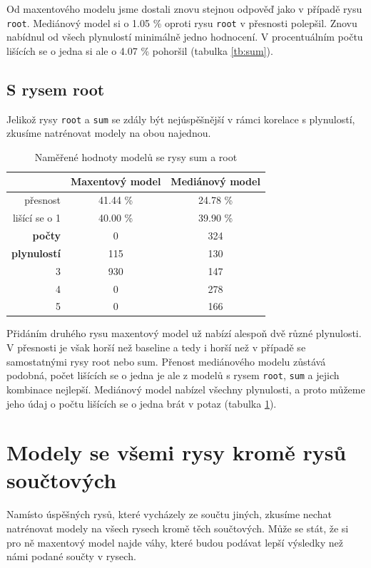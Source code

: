 \documentclass[12pt,a4paper]{report}
\begin{document}
Od maxentového modelu jsme dostali znovu stejnou odpověď jako v případě rysu \texttt{root}. Mediánový model si o 1.05 \% oproti rysu \texttt{root} v přesnosti polepšil. Znovu nabídnul od všech plynulostí minimálně jedno hodnocení. V procentuálním počtu lišících se o jedna si ale o 4.07 \% pohoršil (tabulka \ref{tb:sum}).

\subsection{S rysem root}
Jelikož rysy \texttt{root} a \texttt{sum} se zdály být nejúspěšnější v rámci korelace s plynulostí, zkusíme natrénovat modely na obou najednou.

\begin{table}[!htbp]
\begin{center}
\begin{tabular}{|r|c|c|}
\hline
 & \textbf{Maxentový model} & \textbf{Mediánový model} \\
 \hline
     přesnost & 41.44 \%  & 24.78 \%  \\
\hline
lišící se o 1 & 40.00 \% & 39.90 \%  \\
\hline
     \textbf{počty} \quad 1 & \color{red}0   & \color{OliveGreen}324   \\
\textbf{plynulostí} \quad 2 & 115 & \color{OliveGreen}130   \\
                          3 & 930 & \color{OliveGreen}147 \\
                          4 & \color{red}0   & \color{OliveGreen}278 \\
                          5 & \color{red}0   & \color{OliveGreen}166  \\
\hline
\end{tabular}
\caption{Naměřené hodnoty modelů se rysy sum a root}\label{tb:sumroot}
\end{center}
\end{table}

Přidáním druhého rysu maxentový model už nabízí alespoň dvě různé plynulosti. V přesnosti je však horší než baseline a tedy i horší než v případě se samostatnými rysy root nebo sum. Přenost mediánového modelu zůstává podobná, počet lišících se o jedna je ale z modelů s rysem \texttt{root}, \texttt{sum} a jejich kombinace nejlepší. Mediánový model nabízel všechny plynulosti, a proto můžeme jeho údaj o počtu lišících se o jedna brát v potaz (tabulka \ref{tb:sumroot}).

\section{Modely se všemi rysy kromě rysů součtových}
Namísto úspěšných rysů, které vycházely ze součtu jiných, zkusíme nechat natrénovat modely na všech rysech kromě těch součtových. Může se stát, že si pro ně maxentový model najde váhy, které budou podávat lepší výsledky než námi podané součty v rysech.
\end{document}
